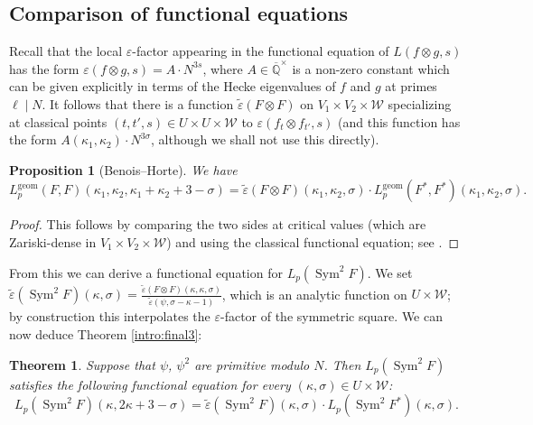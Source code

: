 \documentclass[11pt, a4paper, reqno]{amsart}
\theoremstyle{definition}
\theoremstyle{plain}
\newtheorem{theorem}[definition]{Theorem}
\newtheorem{proposition}[definition]{Proposition}
\theoremstyle{remark}
\DeclareMathOperator{\Sym}{Sym}
\newcommand{\numberset}{\mathbb}
\newcommand{\Q}{\numberset{Q}}
\renewcommand{\epsilon}{\varepsilon}
\newcommand{\Weight}{\mathcal{W}}
\newcommand{\Lgeom}{L_p^{\mathrm{geom}}}
\begin{document}
 \subsection{Comparison of functional equations}

  Recall that the local $\epsilon$-factor appearing in the functional equation of $L(f \otimes g, s)$ has the form $\epsilon(f \otimes g, s) = A \cdot N^{3s}$, where $A \in \overline{\Q}^\times$ is a non-zero constant which can be given explicitly in terms of the Hecke eigenvalues of $f$ and $g$ at primes $\ell \mid N$. It follows that there is a function $\tilde\epsilon(F \otimes F)$ on $V_1 \times V_2 \times \Weight$ specializing at classical points $(t, t', s) \in U \times U \times \Weight$ to $\epsilon(f_t \otimes f_{t'}, s)$ (and this function has the form $A(\kappa_1, \kappa_2) \cdot N^{3\sigma}$, although we shall not use this directly).
    
  \begin{proposition}[Benois--Horte]
   We have
   \[ 
    \Lgeom(F, F)(\kappa_1, \kappa_2, \kappa_1 + \kappa_2 + 3 - \sigma) = \tilde\epsilon(F \otimes F)(\kappa_1, \kappa_2, \sigma) \cdot \Lgeom(F^*, F^*)(\kappa_1, \kappa_2, \sigma). 
   \]
  \end{proposition}
  
  \begin{proof}
   This follows by comparing the two sides at critical values (which are Zariski-dense in $V_1 \times V_2 \times \Weight$) and using the classical functional equation; see \cite[Proposition~6.4.2]{benoishorte23}.
  \end{proof}
  
  From this we can derive a functional equation for $L_p(\Sym^2 F)$. We set $\tilde{\epsilon}(\Sym^2 F)(\kappa, \sigma) = \tfrac{\tilde{\epsilon}(F \otimes F)(\kappa, \kappa, \sigma)}{\tilde{\epsilon}(\psi, \sigma - \kappa - 1)}$, which is an analytic function on $U \times \Weight$; by construction this interpolates the $\varepsilon$-factor of the symmetric square. We can now deduce Theorem \ref{intro:final3}:
  
  \begin{theorem}
   \label{thm:functional-equation}
   Suppose that $\psi$, $\psi^2$ are primitive modulo $N$. Then $L_p(\Sym^2 F)$ satisfies the following functional equation for every $(\kappa,\sigma)\in U\times\Weight$:
   \[
    L_p(\Sym^2 F)(\kappa, 2\kappa + 3 - \sigma) = \tilde{\epsilon}(\Sym^2 F)(\kappa, \sigma) \cdot L_p(\Sym^2 F^*)(\kappa,\sigma).
   \]
  \end{theorem}
  
\end{document}
